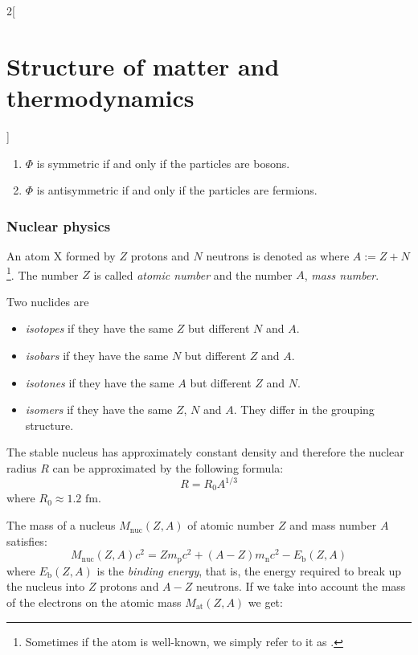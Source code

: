 \documentclass[../../../main.tex]{subfiles}
\begin{document}
\begin{multicols}{2}[\section{Structure of matter and thermodynamics}]
\begin{prop}
        \begin{enumerate}
            \item $\Phi$ is symmetric if and only if the particles are bosons.
            \item $\Phi$ is antisymmetric if and only if the particles are fermions.
        \end{enumerate}
    \end{prop}
    \subsubsection*{Nuclear physics}
    \begin{definition}[Atom]
        An atom X formed by $Z$ protons and $N$ neutrons is denoted as  where $A:=Z+N$\footnote{Sometimes if the atom  is well-known, we simply refer to it as .}. The number $Z$ is called \textit{atomic number} and the number $A$, \textit{mass number}.
    \end{definition}
    \begin{definition}
        Two nuclides are
        \begin{itemize}
            \item \textit{isotopes} if they have the same $Z$ but different $N$ and $A$.
            \item \textit{isobars} if they have the same $N$ but different $Z$ and $A$.
            \item \textit{isotones} if they have the same $A$ but different $Z$ and $N$.
            \item \textit{isomers} if they have the same $Z$, $N$ and $A$. They differ in the grouping structure.
        \end{itemize}
    \end{definition}
    \begin{prop}
        The stable nucleus has approximately constant density and therefore the nuclear radius $R$ can be approximated by the following formula:
        $$R=R_0A^{1/3}$$ where $R_0\approx1.2\text{ fm}$.
    \end{prop}
    \begin{prop}
        The mass of a nucleus $M_\text{nuc}(Z,A)$ of atomic number $Z$ and mass number $A$ satisfies:
        $$M_\text{nuc}(Z,A)c^2=Zm_\text{p}c^2+(A-Z)m_\text{n}c^2-E_\text{b}(Z,A)$$ where $E_\text{b}(Z,A)$ is the \textit{binding energy}, that is, the energy required to break up the nucleus into $Z$ protons and $A-Z$ neutrons. If we take into account the mass of the electrons on the atomic mass $M_\text{at}(Z,A)$ we get:

\end{prop}
\end{multicols}
\end{document}

